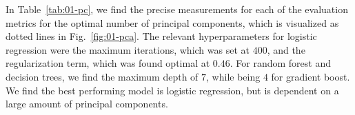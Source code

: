 \documentclass[superscriptaddress,unsortedaddress,
 amsmath,amssymb,
 aps,
]{revtex4-2}
\begin{document}
In Table~\ref{tab:01-pc}, we find the precise measurements for each of the evaluation metrics for the optimal number of principal components, which is visualized as dotted lines in Fig.~\ref{fig:01-pca}. The relevant hyperparameters for logistic regression were the maximum iterations, which was set at $400$, and the regularization term, which was found optimal at $0.46$. For random forest and decision trees, we find the maximum depth of $7$, while being $4$ for gradient boost. We find the best performing model is logistic regression, but is dependent on a large amount of principal components. 


\begin{table}[!ht]
\centering
\caption{A table of the optimal number of principal components and the respective scores (standard deviation) for the Ferrenti approach, as visualized in the dash-dotted line in figure \ref{fig:01-pca}.}
\label{tab:01-pc}
\noindent{}
\end{table}
\end{document}
